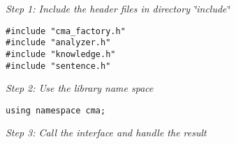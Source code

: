 {\em Step 1: Include the header files in directory \char`\"{}include\char`\"{}\/} 

\begin{Code}\begin{verbatim}#include "cma_factory.h"
#include "analyzer.h"
#include "knowledge.h"
#include "sentence.h"
\end{verbatim}
\end{Code}



{\em Step 2: Use the library name space\/} 

\begin{Code}\begin{verbatim}using namespace cma;
\end{verbatim}
\end{Code}



{\em Step 3: Call the interface and handle the result\/}



